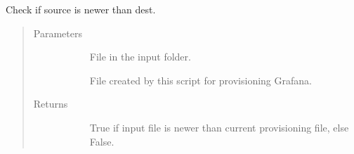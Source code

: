 \documentclass[letterpaper,10pt,english]{sphinxmanual}
\begin{document}
\begin{fulllineitems}
\label{\detokenize{inputs:gpInputs.needsProvisioning}}
Check if source is newer than dest.
\begin{quote}\begin{description}
\item[{Parameters}] \leavevmode\begin{description}
\item[{}] \leavevmode{[}\sphinxtitleref{str}{]}
File in the input folder.

\item[{}] \leavevmode{[}\sphinxtitleref{str}{]}
File created by this script for provisioning Grafana.

\end{description}

\item[{Returns}] \leavevmode\begin{description}
\item[{}] \leavevmode{[}\sphinxtitleref{bool}{]}
True if input file is newer than current provisioning file, else False.

\end{description}

\end{description}\end{quote}

\end{fulllineitems}

\end{document}
